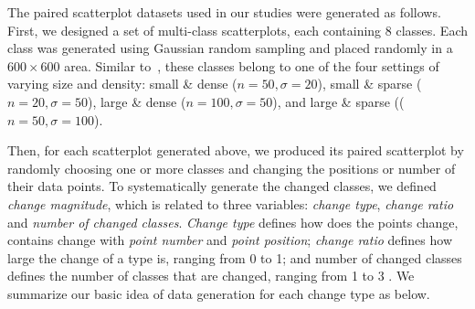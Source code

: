 \vspace{.3em}
The paired scatterplot datasets used in our studies were generated as follows.
First, we designed a set of multi-class scatterplots, each containing $8$ classes. Each class was generated using Gaussian random sampling and placed randomly in a $600 \times 600$ area.
Similar to~\cite{Lu21}, these classes belong to one of the four settings of varying size and density: small \& dense ($n=50, \sigma=20$), small \& sparse ($n=20, \sigma=50$),  large \& dense ($n=100, \sigma=50$), and large \& sparse (($n=50, \sigma=100$).

Then, for each scatterplot generated above, we produced its paired scatterplot by randomly choosing one or more classes and changing the positions or number of their data points.
To systematically generate the changed classes, we defined \emph{change magnitude}, which is related to three variables: \emph{change type}, \emph{change ratio} and \emph{number of changed classes}.
\emph{Change type} defines how does the points change, contains change with \emph{point number} and \emph{point position};
\emph{change ratio} defines how large the change of a type is, ranging from 0 to 1; and {number of changed classes} defines the number of classes that are changed, ranging from 1 to 3
. We summarize our basic idea of data generation for each change type as below.
